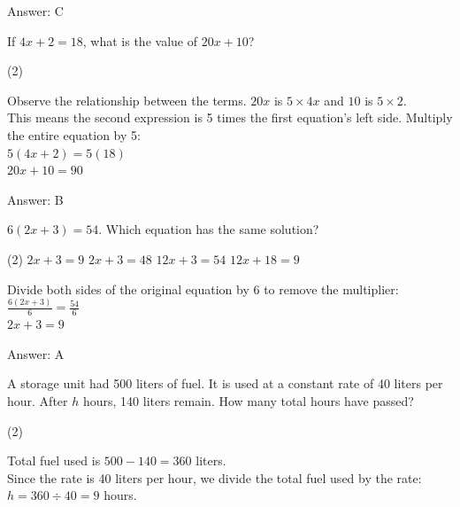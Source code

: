 \documentclass[11pt,paper=a4,answers]{exam}
\begin{document}
\begin{questions}
\begin{solution}
\vspace{20pt}
Answer: \colorbox{yellow!100}{C}
\end{solution}

\question
If $4x + 2 = 18$, what is the value of $20x + 10$?
\begin{tasks}(2)
\end{tasks}

\begin{solution}
Observe the relationship between the terms. $20x$ is $5 \times 4x$ and $10$ is $5 \times 2$. 
\\[10pt]
This means the second expression is 5 times the first equation's left side. Multiply the entire equation by 5:
\\[10pt]
$5(4x + 2) = 5(18)$ \\
$20x + 10 = 90$

\vspace{20pt}
Answer: \colorbox{yellow!100}{B}
\end{solution}

\question
$6(2x + 3) = 54$. Which equation has the same solution?
\begin{tasks}(2)
    \task $2x + 3 = 9$
    \task $2x + 3 = 48$
    \task $12x + 3 = 54$
    \task $12x + 18 = 9$
\end{tasks}

\begin{solution}
Divide both sides of the original equation by 6 to remove the multiplier:
\\[10pt]
$\frac{6(2x + 3)}{6} = \frac{54}{6}$ \\
$2x + 3 = 9$

\vspace{20pt}
Answer: \colorbox{yellow!100}{A}
\end{solution}

\question
A storage unit had 500 liters of fuel. It is used at a constant rate of 40 liters per hour. After $h$ hours, 140 liters remain. How many total hours have passed?
\begin{tasks}(2)
\end{tasks}

\begin{solution}
Total fuel used is $500 - 140 = 360$ liters. 
\\[10pt]
Since the rate is 40 liters per hour, we divide the total fuel used by the rate:
\\[10pt]
$h = 360 \div 40 = 9$ hours.


\end{solution}
\end{questions}
\end{document}
